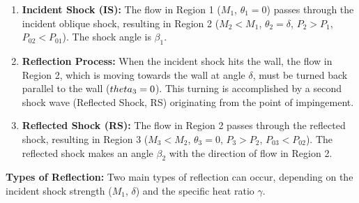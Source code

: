 \begin{enumerate}
\def\labelenumi{\arabic{enumi}.}
\item
  \textbf{Incident Shock (IS):} The flow in Region 1 (\(M_1\),
  \(\theta_1=0\)) passes through the incident oblique shock, resulting
  in Region 2 (\(M_2 < M_1\), \(\theta_2 = \delta\), \(P_2 > P_1\),
  \(P_{02} < P_{01}\)). The shock angle is \(\beta_1\).
\item
  \textbf{Reflection Process:} When the incident shock hits the wall,
  the flow in Region 2, which is moving towards the wall at angle
  \(\delta\), must be turned back parallel to the wall
  (\(\\theta_3 = 0\)). This turning is accomplished by a second shock
  wave (Reflected Shock, RS) originating from the point of impingement.
\item
  \textbf{Reflected Shock (RS):} The flow in Region 2 passes through the
  reflected shock, resulting in Region 3 (\(M_3 < M_2\),
  \(\theta_3 = 0\), \(P_3 > P_2\), \(P_{03} < P_{02}\)). The reflected
  shock makes an angle \(\beta_2\) with the direction of flow in Region
  2.
\end{enumerate}

\textbf{Types of Reflection:} Two main types of reflection can occur,
depending on the incident shock strength (\(M_1\), \(\delta\)) and the
specific heat ratio \(\gamma\).

